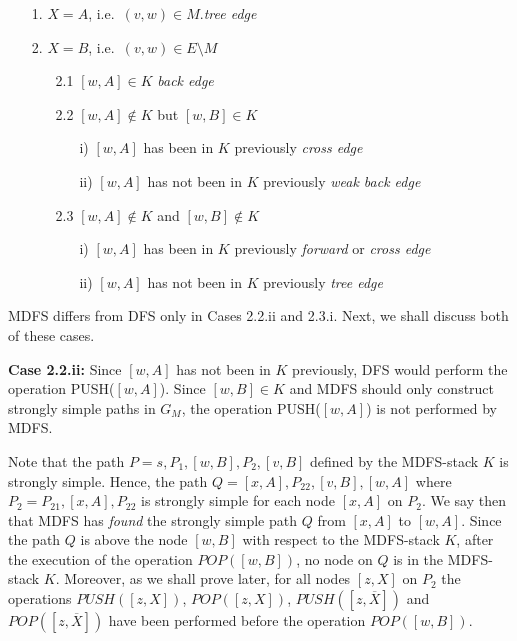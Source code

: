 \documentclass[12pt,twoside,a4paper]{article}
\begin{document}
\begin{itemize}
\item[1.] $X=A$, i.e.\ $(v,w)\in M$.\hfill {\em tree edge}
\item[2.] $X=B$, i.e.\ $(v,w)\in E\setminus M$
      \vspace{-0.2cm}  
      \begin{itemize}
        \item[2.1] $[w,A]\in K$ \hfill {\em back edge}
        \item[2.2] $[w,A]\not\in K$ but $[w,B]\in K$
                \begin{itemize}
                \item[i)] $[w,A]$ has been in $K$ previously \hfill {\em cross edge}
                \item[ii)] $[w,A]$ has not been in $K$ previously \hfill {\em weak back edge}
                \end{itemize} 
        \item[2.3] $[w,A] \not\in K$ and $[w,B]\not\in K$
                \begin{itemize}
                \item[i)] $[w,A]$ has been in $K$ previously \hfill {\em
forward} or {\em cross edge}
                \item[ii)] $[w,A]$ has not been in $K$ previously \hfill {\em tree edge}
                \end{itemize}
        \end{itemize}
\end{itemize}
MDFS differs from DFS only in Cases 2.2.ii and 2.3.i. Next, we shall discuss
both of these cases.

\medskip
\noindent
{\bf Case 2.2.ii:} Since $[w,A]$ has not been in $K$ previously, DFS would 
perform the operation PUSH($[w,A]$). Since $[w,B]\in K$ and
MDFS should only construct strongly simple paths in $G_M$, the operation PUSH($[w,A]$) is 
not performed by MDFS.

Note that the path $P = s,P_1,[w,B],P_2,[v,B]$ defined by the MDFS-stack $K$ is strongly
simple. Hence, the path $Q = [x,A], P_{22},[v,B],[w,A]$ where $P_2 = P_{21},[x,A],P_{22}$ 
is strongly simple for each node $[x,A]$ on $P_2$. We say then that MDFS has {\em found\/}
the strongly simple path $Q$ from $[x,A]$ to $[w,A]$.
Since the path $Q$ is above the node $[w,B]$ with respect to the MDFS-stack $K$, 
after the execution of the operation $POP([w,B])$,
no node on $Q$ is in the MDFS-stack $K$. Moreover, as we shall prove later, for all nodes 
$[z,X]$ on $P_2$ the operations $PUSH([z,X])$, $POP([z,X])$, $PUSH([z,\overline{X}])$
and $POP([z,\overline{X}])$ have been performed before the operation $POP([w,B])$.
\end{document}
